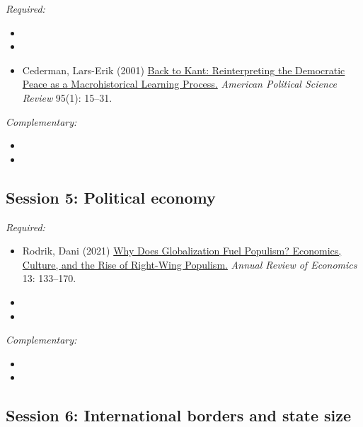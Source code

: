 \documentclass[12pt, a4paper]{article}
\begin{document}


\noindent\textit{Required:}

\begin{itemize}
  \item
  \item
  \item Cederman, Lars-Erik (2001) \href{https://doi.org/10.1017/S0003055401000028}{Back to Kant: Reinterpreting the Democratic Peace as a Macrohistorical Learning Process.} \textit{American Political Science Review} 95(1): 15--31.
\end{itemize}

\noindent\textit{Complementary:}

\begin{itemize}
  \item
  \item
\end{itemize}

\hline
\subsection*{Session 5: Political economy}

\noindent\textit{Required:}

\begin{itemize}
  \item Rodrik, Dani (2021) \href{https://www.annualreviews.org/doi/abs/10.1146/annurev-economics-070220-032416}{Why Does Globalization Fuel Populism? Economics, Culture, and the Rise of Right-Wing Populism.} \textit{Annual Review of Economics} 13: 133--170.
  \item
  \item
\end{itemize}

\noindent\textit{Complementary:}

\begin{itemize}
  \item
  \item
\end{itemize}

\hline
\subsection*{Session 6: International borders and state size}
\end{document}
